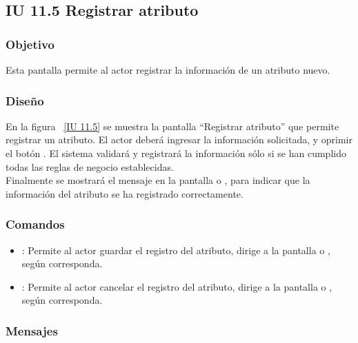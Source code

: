 \subsection{IU 11.5 Registrar atributo}

\subsubsection{Objetivo}
	
	Esta pantalla permite al actor registrar la información de un atributo nuevo.

\subsubsection{Diseño}

    En la figura ~\ref{IU 11.5} se muestra la pantalla ``Registrar atributo'' que permite registrar un atributo. El actor deberá ingresar la información solicitada,
    y oprimir el botón . El sistema validará y registrará la información sólo si se han cumplido todas las reglas de negocio establecidas.  \\
    
    Finalmente se mostrará el mensaje  en la pantalla  o , para indicar que la información del atributo
    se ha registrado correctamente.        



\subsubsection{Comandos}
\begin{itemize}
	\item {}: Permite al actor guardar el registro del atributo, dirige a la pantalla  o , según corresponda.
	\item {}: Permite al actor cancelar el registro del atributo, dirige a la pantalla  o , según corresponda.
\end{itemize}

\subsubsection{Mensajes}

